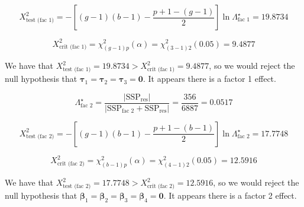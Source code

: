 \begin{enumerate}[label= (\alph*)]
    \[
        X_{\text{test (fac 1)}}^{2}
        =
        -\left[(g-1)(b-1) - \frac{p+1-(g-1)}{2}\right]
        \ln \Lambda_{\text{fac 1}}^{\star}
        =
        19.8734
    \]
    
    \[
        X_{\text{crit (fac 1)}}^{2}
        =
        \chi_{(g-1)p}^{2}(\alpha)
        =
        \chi_{(3-1)2}^{2}(0.05)
        =
        9.4877
    \]

    We have that $X_{\text{test (fac 1)}}^{2} = 19.8734 > X_{\text{crit (fac 1)}}^{2} = 9.4877$, so we would reject the null hypothesis that $\bm{\tau}_{1} = \bm{\tau}_{2} = \bm{\tau}_{3} = \textbf{0}$. It appears there is a factor 1 effect.

    \[
        \Lambda_{\text{fac 2}}^{\star}
        =
        \frac{\left| \text{SSP}_{\text{res}} \right|}{\left| \text{SSP}_{\text{fac 2}} + \text{SSP}_{\text{res}} \right|}
        =
        \frac{356}{6887}
        =
        0.0517
    \]

    \[
        X_{\text{test (fac 2)}}^{2}
        =
        -\left[(g-1)(b-1) - \frac{p+1-(b-1)}{2}\right]
        \ln \Lambda_{\text{fac 2}}^{\star}
        =
        17.7748
    \]
    
    \[
        X_{\text{crit (fac 2)}}^{2}
        =
        \chi_{(b-1)p}^{2}(\alpha)
        =
        \chi_{(4-1)2}^{2}(0.05)
        =
        12.5916
    \]

    We have that $X_{\text{test (fac 2)}}^{2} = 17.7748 > X_{\text{crit (fac 2)}}^{2} = 12.5916$, so we would reject the null hypothesis that $\bm{\beta}_{1} = \bm{\beta}_{2} = \bm{\beta}_{3} = \bm{\beta}_{4} = \textbf{0}$. It appears there is a factor 2 effect.
\end{enumerate}